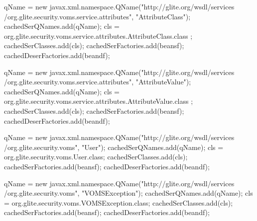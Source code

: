 \begin{DoxyCode}
{            qName = new javax.xml.namespace.QName("http://glite.org/wsdl/services
      /org.glite.security.voms.service.attributes", "AttributeClass");
            cachedSerQNames.add(qName);
            cls = org.glite.security.voms.service.attributes.AttributeClass.class
      ;
            cachedSerClasses.add(cls);
            cachedSerFactories.add(beansf);
            cachedDeserFactories.add(beandf);

            qName = new javax.xml.namespace.QName("http://glite.org/wsdl/services
      /org.glite.security.voms.service.attributes", "AttributeValue");
            cachedSerQNames.add(qName);
            cls = org.glite.security.voms.service.attributes.AttributeValue.class
      ;
            cachedSerClasses.add(cls);
            cachedSerFactories.add(beansf);
            cachedDeserFactories.add(beandf);

            qName = new javax.xml.namespace.QName("http://glite.org/wsdl/services
      /org.glite.security.voms", "User");
            cachedSerQNames.add(qName);
            cls = org.glite.security.voms.User.class;
            cachedSerClasses.add(cls);
            cachedSerFactories.add(beansf);
            cachedDeserFactories.add(beandf);

            qName = new javax.xml.namespace.QName("http://glite.org/wsdl/services
      /org.glite.security.voms", "VOMSException");
            cachedSerQNames.add(qName);
            cls = org.glite.security.voms.VOMSException.class;
            cachedSerClasses.add(cls);
            cachedSerFactories.add(beansf);
            cachedDeserFactories.add(beandf);

    }
\end{DoxyCode}


